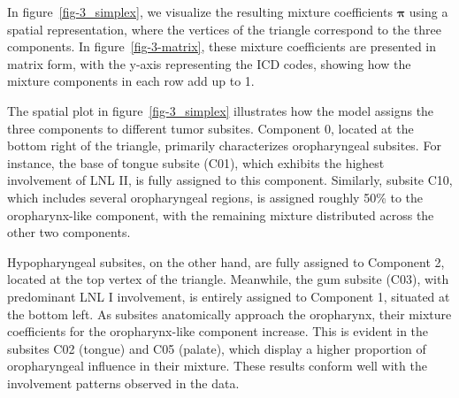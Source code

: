 \documentclass[
  sn-mathphys-num,
]{sn-jnl}
\begin{document}
In figure~\ref{fig-3_simplex}, we visualize the resulting mixture
coefficients \(\boldsymbol{\pi}\) using a spatial representation, where
the vertices of the triangle correspond to the three components. In
figure~\ref{fig-3-matrix}, these mixture coefficients are presented in
matrix form, with the y-axis representing the ICD codes, showing how the
mixture components in each row add up to 1.

The spatial plot in figure~\ref{fig-3_simplex} illustrates how the model
assigns the three components to different tumor subsites. Component 0,
located at the bottom right of the triangle, primarily characterizes
oropharyngeal subsites. For instance, the base of tongue subsite (C01),
which exhibits the highest involvement of LNL II, is fully assigned to
this component. Similarly, subsite C10, which includes several
oropharyngeal regions, is assigned roughly 50\% to the oropharynx-like
component, with the remaining mixture distributed across the other two
components.

Hypopharyngeal subsites, on the other hand, are fully assigned to
Component 2, located at the top vertex of the triangle. Meanwhile, the
gum subsite (C03), with predominant LNL I involvement, is entirely
assigned to Component 1, situated at the bottom left. As subsites
anatomically approach the oropharynx, their mixture coefficients for the
oropharynx-like component increase. This is evident in the subsites C02
(tongue) and C05 (palate), which display a higher proportion of
oropharyngeal influence in their mixture. These results conform well
with the involvement patterns observed in the data.
\end{document}
